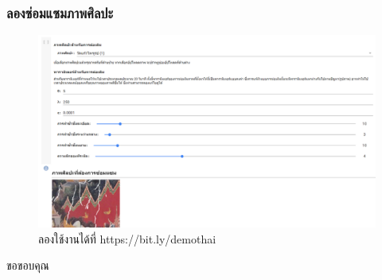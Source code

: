 \documentclass[xcolor=dvipsnames, xetex,serif]{beamer}
\numberwithin{equation}{section}
\begin{document}
    \begin{frame}
        \frametitle{ลองซ่อมแซมภาพศิลปะ}
        \centering
        \begin{figure}[H]
            \centering
            \includegraphics[width=0.8\linewidth]{images/colab_sample.png}
            \caption{ลองใช้งานได้ที่ https://bit.ly/demothai}
        \end{figure}
    \end{frame}
    \begin{frame}
        \centering
        \Huge{ขอขอบคุณ}
    \end{frame}
\end{document}

